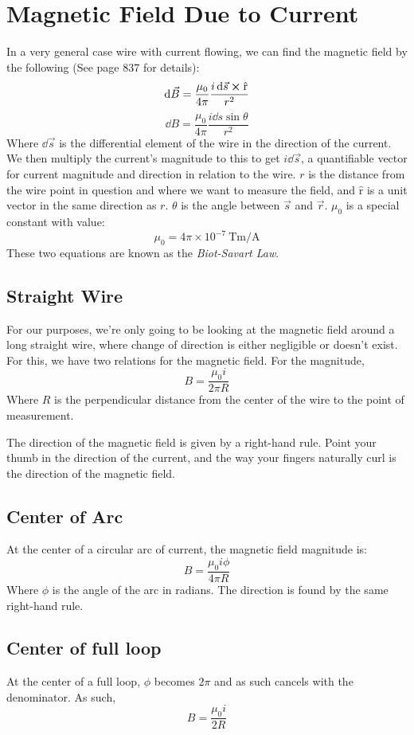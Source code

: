 \documentclass[]{article}
\begin{document}
\section{Magnetic Field Due to Current}
In a very general case wire with current flowing, we can find the magnetic field by the following (See page 837 for details):
\[ \dd{\vec{B}} = \frac{\mu_0}{4 \pi} \frac{i \dd{\vec{s}} \cross \hat{\textrm{r}}}{r^2} \]
\[ \dd{B} = \frac{\mu_0}{4 \pi} \frac{i \dd{s} \sin \theta}{r^2} \]
Where $ \dd{\vec{s}} $ is the differential element of the wire in the direction of the current. We then multiply the current's magnitude to this to get $ i \dd{\vec{s}} $, a quantifiable vector for current magnitude and direction in relation to the wire. $ r $ is the distance from the wire point in question and where we want to measure the field, and $ \hat{\textrm{r}} $ is a unit vector in the same direction as $ r $. $ \theta $ is the angle between $ \vec{s} $ and $ \vec{r} $. $ \mu_0 $ is a special constant with value:
\[ \mu_0 = 4 \pi \times 10^{-7} ~ \unit{\tesla\meter\per\ampere} \]
These two equations are known as the \emph{Biot-Savart Law}.

\subsection{Straight Wire}
For our purposes, we're only going to be looking at the magnetic field around a long straight wire, where change of direction is either negligible or doesn't exist. For this, we have two relations for the magnetic field. For the magnitude,
\[ B = \frac{\mu_0 i}{2 \pi R} \]
Where $ R $ is the perpendicular distance from the center of the wire to the point of measurement.

The direction of the magnetic field is given by a right-hand rule. Point your thumb in the direction of the current, and the way your fingers naturally curl is the direction of the magnetic field.

\subsection{Center of Arc}
At the center of a circular arc of current, the magnetic field magnitude is:
\[ B = \frac{\mu_0 i \phi}{4 \pi R} \]
Where $ \phi $ is the angle of the arc in radians. The direction is found by the same right-hand rule.

\subsection{Center of full loop}
At the center of a full loop, $ \phi $ becomes $ 2\pi $ and as such cancels with the denominator. As such,
\[ B = \frac{\mu_0 i}{2 R} \]
\end{document}
